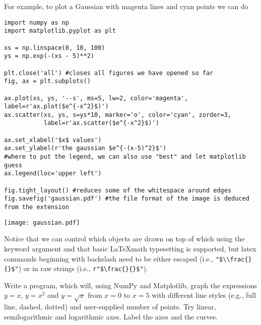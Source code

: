 For example, to plot a Gaussian with magenta lines and cyan points we can do
\begin{lstlisting}[caption=Complete plotting example.]
import numpy as np
import matplotlib.pyplot as plt

xs = np.linspace(0, 10, 100)
ys = np.exp(-(xs - 5)**2)

plt.close('all') #closes all figures we have opened so far
fig, ax = plt.subplots()

ax.plot(xs, ys, '--s', ms=5, lw=2, color='magenta', label=r'ax.plot($e^{-x^2}$)')
ax.scatter(xs, ys, s=ys*10, marker='o', color='cyan', zorder=3,
           label=r'ax.scatter($e^{-x^2}$)')

ax.set_xlabel('$x$ values')
ax.set_ylabel(r'the gaussian $e^{-(x-5)^2}$')
#where to put the legend, we can also use "best" and let matplotlib guess
ax.legend(loc='upper left')

fig.tight_layout() #reduces some of the whitespace around edges
fig.savefig('gaussian.pdf') #the file format of the image is deduced from the extension
\end{lstlisting}
\begin{center}
    \texttt{[image: gaussian.pdf]}
\end{center}
Notice that we can control which objects are drawn on top of which using the  keyword argument and that basic \LaTeX math typesetting is supported, but latex commands beginning with backslash need to be either escaped (i.e., \verb|"$\\frac{}{}$"|) or in raw strings (i.e., \verb|r"$\frac{}{}$"|).

\begin{exercise}
    Write a program, which will, using NumPy and Matplotlib, graph the expressions $y=x$, $y=x^2$ and $y=\sqrt{x}$ from $x=0$ to $x=5$ with different line styles (e.g., full line, dashed, dotted) and user-supplied number of points. Try linear, semilogarithmic and logarithmic axes. Label the axes and the curves.
\end{exercise}

